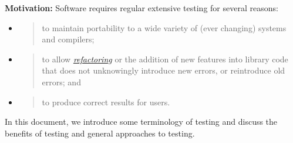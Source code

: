 \documentclass[]{article}
\date{}
\begin{document}
\pagestyle{fancy}
\renewcommand{\headrulewidth}{0pt}
  
\thispagestyle{empty}
\textbf{\newline}


\textbf{Motivation:} Software requires regular extensive testing for
several reasons:

\begin{itemize}
\item
  \begin{quote}
  to maintain portability to a wide variety of (ever changing) systems
  and compilers;
  \end{quote}
\item
  \begin{quote}
  to allow
  \href{http://www.google.com/url?q=http\%3A\%2F\%2Fen.wikipedia.org\%2Fwiki\%2FCode_refactoring\&sa=D\&sntz=1\&usg=AFQjCNFVmEifSFcA6yNJs7Tp6VS-LwRw4w}{\emph{refactoring}}
  or the addition of new features into library code that does not
  unknowingly introduce new errors, or reintroduce old errors; and
  \end{quote}
\item
  \begin{quote}
  to produce correct results for users.
  \end{quote}
\end{itemize}

In this document, we introduce some terminology of testing and discuss
the benefits of testing and general approaches to testing.
\end{document}
